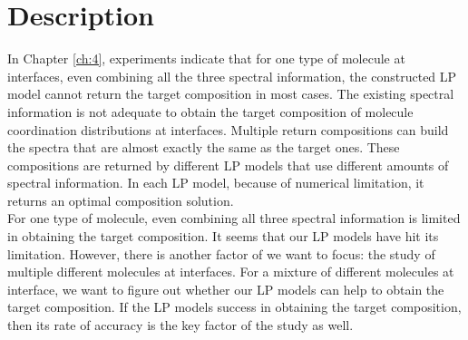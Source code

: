  \label{ch:5}
\section{Description}

In Chapter \ref{ch:4}, experiments indicate that for one type of molecule at interfaces, even combining all the three spectral information, the constructed LP model cannot return the target composition in most cases. The existing spectral information is not adequate to obtain the target composition of molecule coordination distributions at interfaces. Multiple return compositions can build the spectra that are almost exactly the same as the target ones. These compositions are returned by different LP models that use different amounts of spectral information. In each LP model, because of numerical limitation, it returns an optimal composition solution. \\





For one type of molecule, even combining all three spectral information is limited in obtaining the target composition. It seems that our LP models have hit its limitation. However, there is another factor of we want to focus: the study of multiple different molecules at interfaces. For a mixture of different molecules at interface, we want to figure out whether our LP models can help to obtain the target composition. If the LP models success in obtaining the target composition, then its rate of accuracy is the key factor of the study as well. \\


